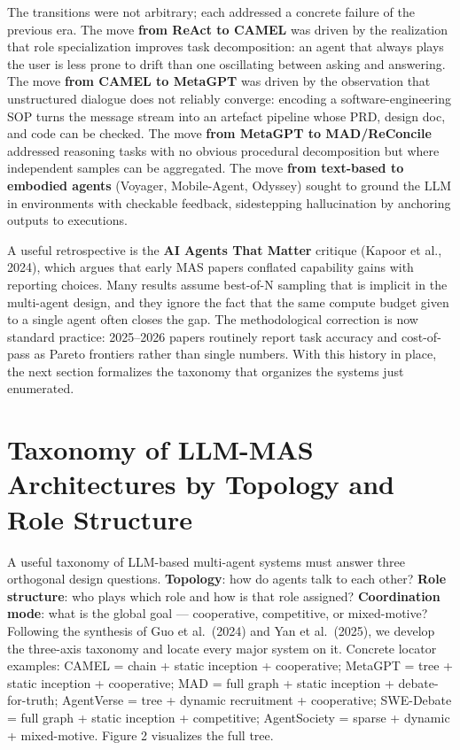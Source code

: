 The transitions were not arbitrary; each addressed a concrete failure of the previous era. The move \textbf{from ReAct to CAMEL} was driven by the realization that role specialization improves task decomposition: an agent that always plays the user is less prone to drift than one oscillating between asking and answering. The move \textbf{from CAMEL to MetaGPT} was driven by the observation that unstructured dialogue does not reliably converge: encoding a software-engineering SOP turns the message stream into an artefact pipeline whose PRD, design doc, and code can be checked. The move \textbf{from MetaGPT to MAD/ReConcile} addressed reasoning tasks with no obvious procedural decomposition but where independent samples can be aggregated. The move \textbf{from text-based to embodied agents} (Voyager, Mobile-Agent, Odyssey) sought to ground the LLM in environments with checkable feedback, sidestepping hallucination by anchoring outputs to executions.

A useful retrospective is the \textbf{AI Agents That Matter} critique (Kapoor et al., 2024), which argues that early MAS papers conflated capability gains with reporting choices. Many results assume best-of-N sampling that is implicit in the multi-agent design, and they ignore the fact that the same compute budget given to a single agent often closes the gap. The methodological correction is now standard practice: 2025--2026 papers routinely report task accuracy and cost-of-pass as Pareto frontiers rather than single numbers. With this history in place, the next section formalizes the taxonomy that organizes the systems just enumerated.

\section{Taxonomy of LLM-MAS Architectures by Topology and Role Structure}\label{taxonomy-of-llm-mas-architectures-by-topology-and-role-structure}

A useful taxonomy of LLM-based multi-agent systems must answer three orthogonal design questions. \textbf{Topology}: how do agents talk to each other? \textbf{Role structure}: who plays which role and how is that role assigned? \textbf{Coordination mode}: what is the global goal --- cooperative, competitive, or mixed-motive? Following the synthesis of Guo et al.~(2024) and Yan et al.~(2025), we develop the three-axis taxonomy and locate every major system on it. Concrete locator examples: CAMEL = chain + static inception + cooperative; MetaGPT = tree + static inception + cooperative; MAD = full graph + static inception + debate-for-truth; AgentVerse = tree + dynamic recruitment + cooperative; SWE-Debate = full graph + static inception + competitive; AgentSociety = sparse + dynamic + mixed-motive. Figure 2 visualizes the full tree.

